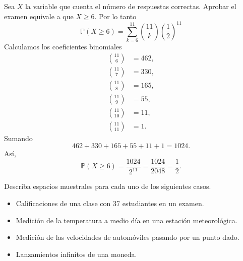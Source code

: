 \documentclass[12pt,a4paper]{article}
\newcommand{\paren}[1]{\left( #1 \right)}
\begin{document}
    \begin{solucion}
        Sea $X$ la variable que cuenta el número de respuestas correctas. Aprobar el
        examen equivale a que $X\geq6$. Por lo tanto
        \begin{equation*}
            \mathbb{P}(X\geq6)=\sum_{k=6}^{11}\binom{11}{k}\paren{\frac{1}{2}}^{11}
        \end{equation*}
        Calculamos los coeficientes binomiales
        \begin{align*}
            \binom{11}{6}&=462,\\
            \binom{11}{7}&=330,\\
            \binom{11}{8}&=165,\\
            \binom{11}{9}&=55,\\
            \binom{11}{10}&=11,\\
            \binom{11}{11}&=1.
        \end{align*}
        Sumando
        \begin{equation*}
            462+330+165+55+11+1=1024.
        \end{equation*}
        Así,
        \begin{equation*}
            \mathbb{P}(X\geq6)=\frac{1024}{2^{11}}=\frac{1024}{2048}=\frac{1}{2}.
        \end{equation*}
    \end{solucion}

    \begin{mdframed}[style=mdbluebox,frametitle={Ejercicio 3}]
        Describa espacios muestrales para cada uno de los siguientes casos.
        \begin{itemize}
            \item[(a)] Calificaciones de una clase con 37 estudiantes en un examen.
            \item[(b)] Medición de la temperatura a medio día en una estación meteorológica.
            \item[(c)] Medición de las velocidades de automóviles pasando por un punto dado.
            \item[(d)] Lanzamientos infinitos de una moneda.
        \end{itemize}
    \end{mdframed}
\end{document}
